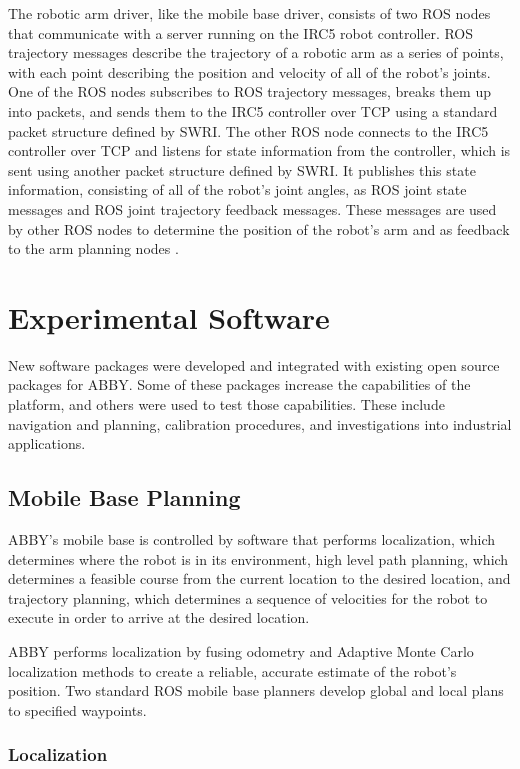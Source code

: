 \documentclass[]{cwru} %
\begin{document}
The robotic arm driver, like the mobile base driver, consists of two ROS
nodes that communicate with a server running on the IRC5 robot
controller. ROS trajectory messages describe the trajectory of a robotic
arm as a series of points, with each point describing the position and
velocity of all of the robot's joints. One of the ROS nodes subscribes
to ROS trajectory messages, breaks them up into packets, and sends them
to the IRC5 controller over TCP using a standard packet structure
defined by SWRI. The other ROS node connects to the IRC5 controller over
TCP and listens for state information from the controller, which is sent
using another packet structure defined by SWRI. It publishes this state
information, consisting of all of the robot's joint angles, as ROS joint
state messages and ROS joint trajectory feedback messages. These
messages are used by other ROS nodes to determine the position of the
robot's arm and as feedback to the arm planning nodes \cite{venator_case}.

\chapter{Experimental Software}

New software packages were developed
and integrated with existing open source packages for ABBY. Some of
these packages increase the capabilities of the platform, and others
were used to test those capabilities. These include navigation and
planning, calibration procedures, and investigations into industrial
applications.

\section{Mobile Base Planning}


ABBY's mobile base is controlled by software that performs localization,
which determines where the robot is in its environment, high level path
planning, which determines a feasible course from the current location
to the desired location, and trajectory planning, which determines a
sequence of velocities for the robot to execute in order to arrive at
the desired location.

ABBY performs localization by fusing odometry and Adaptive Monte Carlo
localization methods to create a reliable, accurate estimate of the
robot's position. Two standard ROS mobile base planners develop global
and local plans to specified
waypoints.

\subsection{Localization}
\label{localization}
\end{document}
